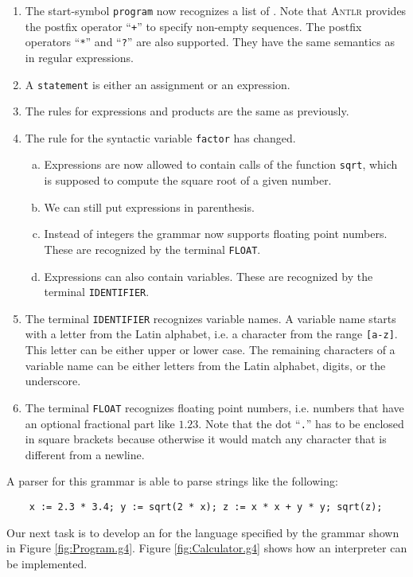 \begin{enumerate}
\item The start-symbol \texttt{program} now recognizes a list of .
      Note that \textsc{Antlr} provides the postfix operator ``\texttt{+}'' to
      specify non-empty sequences.  The postfix operators ``\texttt{*}'' and ``\texttt{?}'' are also 
      supported.  They have the same semantics as in regular expressions.
\item A \texttt{statement} is either an assignment or an expression. 
\item The rules for expressions and products are the same as previously.
\item The rule for the syntactic variable \texttt{factor} has changed.
      \begin{enumerate}[(a)]
      \item Expressions are now allowed to contain calls of the function \texttt{sqrt},
            which is supposed to compute the square root of a given number.
      \item We can still put expressions in parenthesis.
      \item Instead of integers the grammar now supports floating point numbers.
            These are recognized by the terminal \texttt{FLOAT}.
      \item Expressions can also contain variables.  These are recognized by the terminal
            \texttt{IDENTIFIER}.
      \end{enumerate}
\item The terminal \texttt{IDENTIFIER} recognizes variable names.  A variable name starts with 
      a letter from the Latin alphabet, i.e. a character from the range \texttt{[a-z]}.  This letter can be either
      upper or lower case.  The remaining characters of a variable name can be either letters from the Latin
      alphabet, digits, or the underscore.
\item The terminal \texttt{FLOAT} recognizes floating point numbers, i.e. numbers that have an optional
      fractional part like $1.23$.  Note that the dot ``\texttt{.}'' has to be enclosed in square
      brackets because otherwise it would match any character that is different from a newline.  
\end{enumerate}
A parser for this grammar is able to parse strings like the following:
\begin{verbatim}
    x := 2.3 * 3.4; y := sqrt(2 * x); z := x * x + y * y; sqrt(z);
\end{verbatim}
Our next task is to develop an  for the language specified by the grammar shown 
in Figure \ref{fig:Program.g4}.  Figure \ref{fig:Calculator.g4} shows how an interpreter can be implemented.



